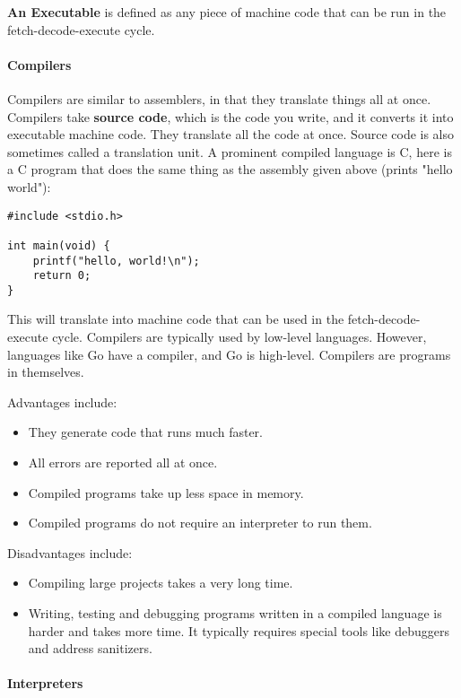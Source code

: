 \documentclass[../main.tex]{subfiles}
\begin{document}
\textbf{An Executable} is defined as any piece of machine code that can be run in the fetch-decode-execute cycle.

\paragraph{Compilers}

Compilers are similar to assemblers, in that they translate things all at once. Compilers take \textbf{source code}, which is the code you write, and it converts it into executable machine code. They translate all the code at once. Source code is also sometimes called a translation unit. A prominent compiled language is C, here is a C program that does the same thing as the assembly given above (prints "hello world"):

\begin{verbatim}
#include <stdio.h>

int main(void) {
    printf("hello, world!\n");
    return 0;
}
\end{verbatim}

This will translate into machine code that can be used in the fetch-decode-execute cycle. Compilers are typically used by low-level languages. However, languages like Go have a compiler, and Go is high-level. Compilers are programs in themselves.

Advantages include:

\begin{itemize}
    \item They generate code that runs much faster.
    \item All errors are reported all at once.
    \item Compiled programs take up less space in memory.
    \item Compiled programs do not require an interpreter to run them.
\end{itemize}

Disadvantages include:

\begin{itemize}
    \item Compiling large projects takes a very long time.
    \item Writing, testing and debugging programs written in a compiled language is harder and takes more time. It typically requires special tools like debuggers and address sanitizers.
\end{itemize}

\paragraph{Interpreters}
\end{document}

